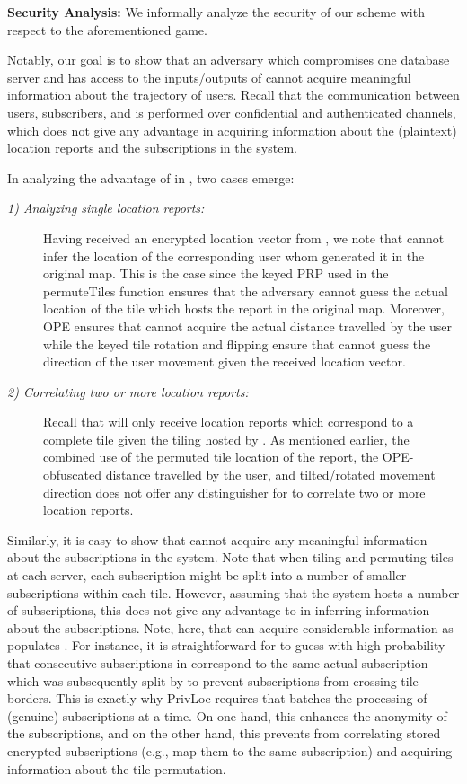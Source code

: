 \documentclass{llncs}
\newcommand\sol{{\sf PrivLoc}}
\begin{document}
\vspace{1 em} \noindent \textbf{Security Analysis: }We informally analyze the security of our scheme with respect to the aforementioned  game.

Notably, our goal is to show that an adversary  which compromises one database server  and has access to the inputs/outputs of  cannot acquire meaningful information
about the trajectory of users. Recall that the communication between users, subscribers, and  is performed over confidential and authenticated channels, which does not
give  any advantage in acquiring information about the (plaintext) location reports and the subscriptions in the system.

In analyzing the advantage of  in , two cases emerge:
\begin{description}
\item[\emph{1) Analyzing single location reports: }] Having received an encrypted location vector from , we note that  cannot infer the location of the corresponding user whom generated it in the original map. This is the case
since the keyed PRP used in the {\sf permuteTiles} function ensures that the adversary cannot guess the actual location of the tile which hosts the report in the original map. Moreover, OPE ensures that  cannot
acquire the actual distance travelled by the user while the keyed tile rotation and flipping ensure that  cannot guess the direction of the user movement given the received location vector.
\item[\emph{2) Correlating two or more location reports: }] Recall that  will only receive location reports which correspond to a complete tile given the tiling hosted by . As mentioned earlier, the combined use of the permuted tile location of the report, the OPE-obfuscated distance
travelled by the user, and tilted/rotated movement direction does not offer any distinguisher for  to correlate two or more location reports.
\end{description}



Similarly, it is easy to show that  cannot acquire any meaningful information about the subscriptions in the system. Note that when tiling and permuting tiles at each server, each subscription
might be split into a number of smaller subscriptions within each tile. However, assuming that the system hosts a number of subscriptions, this does not give any advantage to  in inferring information about the subscriptions.
Note, here, that  can acquire considerable information as  populates . For instance, it is straightforward for  to guess with high probability that consecutive subscriptions
in 
correspond to the same actual subscription which was subsequently split by  to prevent subscriptions from crossing tile borders. This is exactly why \sol{} requires that  batches the processing of  (genuine) subscriptions
at a time. On one hand, this enhances the anonymity of the subscriptions, and on the other hand, this prevents  from correlating stored encrypted subscriptions (e.g., map them to the same subscription) and acquiring information about the tile permutation.
\end{document}
